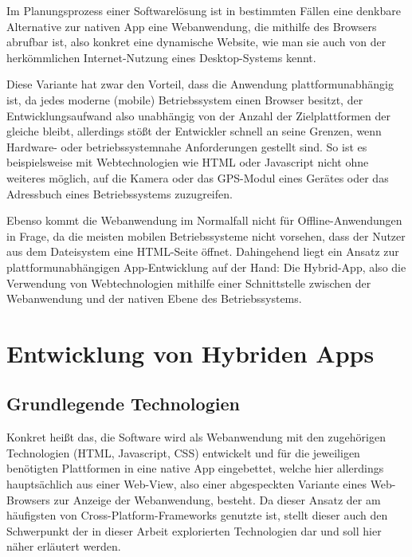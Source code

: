 Im Planungsprozess einer Softwarelösung ist in bestimmten Fällen eine denkbare Alternative zur nativen App eine Webanwendung, die mithilfe des Browsers abrufbar ist, also konkret eine dynamische Website, wie man sie auch von der herkömmlichen Internet-Nutzung eines Desktop-Systems kennt. 

Diese Variante hat zwar den Vorteil, dass die Anwendung plattformunabhängig ist, da jedes moderne (mobile) Betriebssystem einen Browser besitzt, der Entwicklungsaufwand also unabhängig von der Anzahl der Zielplattformen der gleiche bleibt, allerdings stößt der Entwickler schnell an seine Grenzen, wenn Hardware- oder betriebssystemnahe Anforderungen gestellt sind. So ist es beispielsweise mit Webtechnologien wie HTML oder Javascript nicht ohne weiteres möglich, auf die Kamera oder das GPS-Modul eines Gerätes oder das Adressbuch eines Betriebssystems zuzugreifen.

Ebenso kommt die Webanwendung im Normalfall nicht für Offline-Anwendungen in Frage, da die meisten mobilen Betriebssysteme nicht vorsehen, dass der Nutzer aus dem Dateisystem eine HTML-Seite öffnet.  
Dahingehend liegt ein Ansatz zur plattformunabhängigen App-Entwicklung auf der Hand: Die Hybrid-App, also die Verwendung von Webtechnologien mithilfe einer Schnittstelle zwischen der Webanwendung und der nativen Ebene des Betriebssystems.

\section{Entwicklung von Hybriden Apps}
\subsection{Grundlegende Technologien}
Konkret heißt das, die Software wird als Webanwendung mit den zugehörigen Technologien (HTML, Javascript, CSS) entwickelt und für die jeweiligen benötigten Plattformen in eine native App eingebettet, welche hier allerdings hauptsächlich aus einer Web-View, also einer abgespeckten Variante eines Web-Browsers zur Anzeige der Webanwendung, besteht. Da dieser Ansatz der am häufigsten von Cross-Platform-Frameworks genutzte ist,  stellt dieser auch den Schwerpunkt der in dieser Arbeit explorierten Technologien dar und soll hier näher erläutert werden. 

